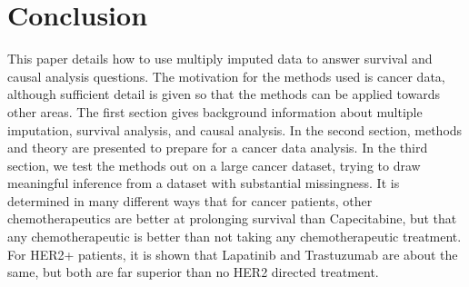 \chapter{Conclusion}
This paper details how to use multiply imputed data to answer survival and causal analysis questions. The motivation for the methods used is cancer data, although sufficient detail is given so that the methods can be applied towards other areas. The first section gives background information about multiple imputation, survival analysis, and causal analysis. In the second section, methods and theory are presented to prepare for a cancer data analysis. In the third section, we test the methods out on a large cancer dataset, trying to draw meaningful inference from a dataset with substantial missingness. It is determined in many different ways that for cancer patients, other chemotherapeutics are better at prolonging survival than Capecitabine, but that any chemotherapeutic is better than not taking any chemotherapeutic treatment. For HER2+ patients, it is shown that Lapatinib and Trastuzumab are about the same, but both are far superior than no HER2 directed treatment.
